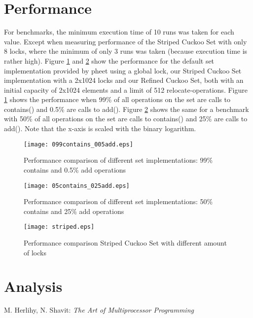 \documentclass[a4paper,10pt]{article}
\begin{document}
\section{Performance}
\label{sec:performance}
For benchmarks, the minimum execution time of 10 runs was taken for each value. Except when measuring performance of the Striped Cuckoo Set with only 8 locks, where the minimum of only 3 runs was taken (because execution time is rather high).
\medskip
\newline
Figure \ref{fig:plot1} and \ref{fig:plot2} show the performance for the default set implementation provided by pheet using a global lock, our Striped Cuckoo Set implementation with a 2x1024 locks and our Refined Cuckoo Set, both with an initial capacity of 2x1024 elements and a limit of 512 relocate-operations. Figure \ref{fig:plot1} shows the performance when 99\% of all operations on the set are calls to contains() and 0.5\% are calls to add(). Figure \ref{fig:plot2} shows the same for a benchmark with 50\% of all operations on the set are calls to contains() and 25\% are calls to add().
\newline
Note that the x-axis is scaled with the binary logarithm.

\begin{figure}
\begin{center}
\texttt{[image: 099contains\_005add.eps]}
\end{center}
\caption{Performance comparison of different set implementations: 99\% contains and 0.5\% add operations}
\label{fig:plot1}
\end{figure}

\begin{figure}
\begin{center}
\texttt{[image: 05contains\_025add.eps]}
\end{center}
\caption{Performance comparison of different set implementations: 50\% contains and 25\% add operations}
\label{fig:plot2}
\end{figure}

\begin{figure}
\begin{center}
\texttt{[image: striped.eps]}
\end{center}
\caption{Performance comparison Striped Cuckoo Set with different amount of locks}
\label{fig:plot3}
\end{figure}

\section{Analysis}
\label{sec:analysis}


\begin{thebibliography}{9}
    M. Herlihy, N. Shavit:
   \emph{The Art of Multiprocessor Programming}
\end{thebibliography}
\end{document}
